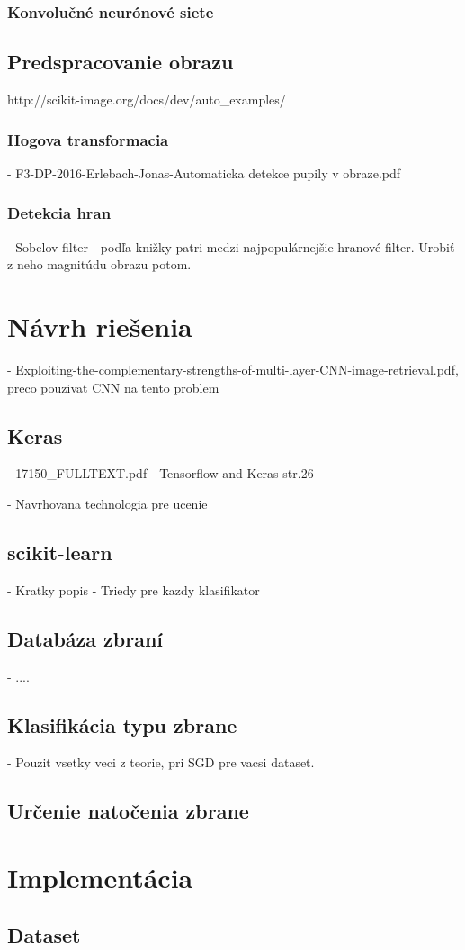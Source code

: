 \subsection{Konvolučné neurónové siete}


\section{Predspracovanie obrazu}
http://scikit-image.org/docs/dev/auto\_examples/

\subsection{Hogova transformacia}
- F3-DP-2016-Erlebach-Jonas-Automaticka detekce pupily v obraze.pdf

\subsection{Detekcia hran}

- Sobelov filter - podľa knižky patri medzi najpopulárnejšie hranové filter.
Urobiť z neho magnitúdu obrazu potom.

\chapter{Návrh riešenia}

- Exploiting-the-complementary-strengths-of-multi-layer-CNN-image-retrieval.pdf,
preco pouzivat CNN na tento problem

\section{Keras}
- 17150\_FULLTEXT.pdf - Tensorflow and Keras str.26

- Navrhovana technologia pre ucenie

\section{scikit-learn}
- Kratky popis
- Triedy pre kazdy klasifikator

\section{Databáza zbraní}
- ....

\section{Klasifikácia typu zbrane}
- Pouzit vsetky veci z teorie, pri SGD pre vacsi dataset.

\section{Určenie natočenia zbrane}


\pagebreak
\chapter{Implementácia}

\section{Dataset}
